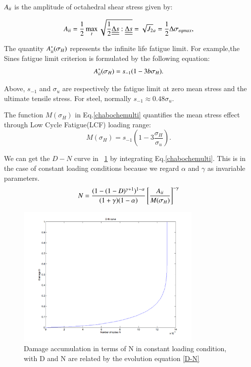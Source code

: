 \documentclass[3p,times,procedia,number]{elsarticle}
\newcommand{\figref}[1]{\figurename~\ref{#1}}
\begin{document}
$A_{\uppercase\expandafter{\romannumeral2}}$ is the amplitude of octahedral shear stress given by:

\begin{equation}A_{\uppercase\expandafter{\romannumeral2}}=\frac{1}{2}\max\limits_{t}\sqrt{\frac{1}{2}\uline{\uline{\Delta s}}:\uline{\uline{\Delta s}}}=\sqrt{J_2}_a=\frac{1}{2}\Delta\sigma_{eqmax},\end{equation}

The quantity $A_{\uppercase\expandafter{\romannumeral2}}^\ast(\sigma_H)$ represents the infinite life fatigue limit. For example,the Sines fatigue limit criterion is formulated by the following equation:
\begin{equation} A_{\uppercase\expandafter{\romannumeral2}}^\ast(\sigma_H)=s_{-1}(1-3b\sigma_H).\end{equation}

Above, $s_{-1}$ and $\sigma_{u}$ are respectively the fatigue limit at zero mean stress and the ultimate tensile stress. For steel, normally $s_{-1}\approx 0.48\sigma_{u}$.

The function $M(\sigma_H)$ in Eq.\eqref{chabochemulti} quantifies the mean stress effect through Low Cycle Fatigue(LCF) loading range:
$$M(\sigma_H)=s_{-1}\left(1-3\frac{\sigma_H}{\sigma_u}\right).$$

We can get the $D-N$ curve in \figref{DN} by integrating Eq.\eqref{chabochemulti}. This is in the case of constant loading conditions because we regard $\alpha$ and $\gamma$ as invariable parameters.
\begin{equation}N =\frac{( 1 -(1-D)^{\gamma+1})^{1-\alpha}}{(1+\gamma)(1-\alpha)}\left[\frac{A_{\uppercase\expandafter{\romannumeral2}}}{M(\sigma_H)}\right]^{-\gamma} 
\label{D-N}
\end{equation} 

\begin{figure}[h!]
	\centering
	\includegraphics[width=0.8\textwidth]{figures//D-N.png} 
	\caption{Damage accumulation in terms of N in constant loading condition, with D and N are related by the evolution equation \eqref{D-N}}
	\label{DN}
\end{figure}
\end{document}
